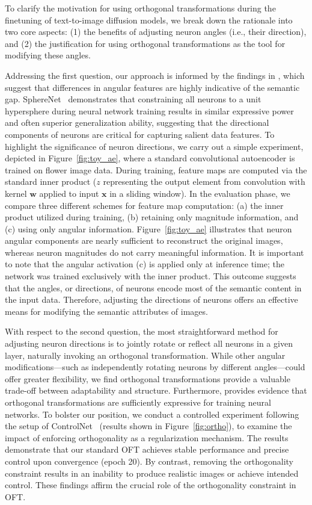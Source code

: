 To clarify the motivation for using orthogonal transformations during the finetuning of text-to-image diffusion models, we break down the rationale into two core aspects: (1) the benefits of adjusting neuron angles (i.e., their direction), and (2) the justification for using orthogonal transformations as the tool for modifying these angles.

Addressing the first question, our approach is informed by the findings in \cite{liu2018decoupled,chen2020angular}, which suggest that differences in angular features are highly indicative of the semantic gap. SphereNet~\cite{liu2017deep} demonstrates that constraining all neurons to a unit hypersphere during neural network training results in similar expressive power and often superior generalization ability, suggesting that the directional components of neurons are critical for capturing salient data features. To highlight the significance of neuron directions, we carry out a simple experiment, depicted in Figure~\ref{fig:toy_ae}, where a standard convolutional autoencoder is trained on flower image data. During training, feature maps are computed via the standard inner product ($z$ representing the output element from convolution with kernel $\bm{w}$ applied to input $\bm{x}$ in a sliding window). In the evaluation phase, we compare three different schemes for feature map computation: (a) the inner product utilized during training, (b) retaining only magnitude information, and (c) using only angular information. Figure~\ref{fig:toy_ae} illustrates that neuron angular components are nearly sufficient to reconstruct the original images, whereas neuron magnitudes do not carry meaningful information. It is important to note that the angular activation (c) is applied only at inference time; the network was trained exclusively with the inner product. This outcome suggests that the angles, or directions, of neurons encode most of the semantic content in the input data. Therefore, adjusting the directions of neurons offers an effective means for modifying the semantic attributes of images.

With respect to the second question, the most straightforward method for adjusting neuron directions is to jointly rotate or reflect all neurons in a given layer, naturally invoking an orthogonal transformation. While other angular modifications—such as independently rotating neurons by different angles—could offer greater flexibility, we find orthogonal transformations provide a valuable trade-off between adaptability and structure. Furthermore, \cite{liu2021orthogonal} provides evidence that orthogonal transformations are sufficiently expressive for training neural networks. To bolster our position, we conduct a controlled experiment following the setup of ControlNet~\cite{zhang2023adding} (results shown in Figure~\ref{fig:ortho}), to examine the impact of enforcing orthogonality as a regularization mechanism. The results demonstrate that our standard OFT achieves stable performance and precise control upon convergence (epoch 20). By contrast, removing the orthogonality constraint results in an inability to produce realistic images or achieve intended control. These findings affirm the crucial role of the orthogonality constraint in OFT.

